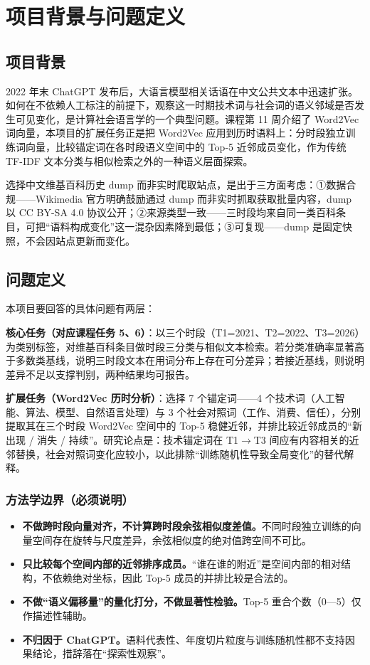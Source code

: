 \documentclass[12pt,a4paper]{article}
\begin{document}
\section{项目背景与问题定义}

\subsection{项目背景}

2022 年末 ChatGPT 发布后，大语言模型相关话语在中文公共文本中迅速扩张。如何在不依赖人工标注的前提下，观察这一时期技术词与社会词的语义邻域是否发生可见变化，是计算社会语言学的一个典型问题。课程第 11 周介绍了 Word2Vec 词向量，本项目的扩展任务正是把 Word2Vec 应用到历时语料上：分时段独立训练词向量，比较锚定词在各时段语义空间中的 Top-5 近邻成员变化，作为传统 TF-IDF 文本分类与相似检索之外的一种语义层面探索。

选择中文维基百科历史 dump 而非实时爬取站点，是出于三方面考虑：①数据合规——Wikimedia 官方明确鼓励通过 dump 而非实时抓取获取批量内容，dump 以 CC BY-SA 4.0 协议公开；②来源类型一致——三时段均来自同一类百科条目，可把“语料构成变化”这一混杂因素降到最低；③可复现——dump 是固定快照，不会因站点更新而变化。

\subsection{问题定义}

本项目要回答的具体问题有两层：

\textbf{核心任务（对应课程任务 5、6）}：以三个时段（T1=2021、T2=2022、T3=2026）为类别标签，对维基百科条目做时段三分类与相似文本检索。若分类准确率显著高于多数类基线，说明三时段文本在用词分布上存在可分差异；若接近基线，则说明差异不足以支撑判别，两种结果均可报告。

\textbf{扩展任务（Word2Vec 历时分析）}：选择 7 个锚定词——4 个技术词（人工智能、算法、模型、自然语言处理）与 3 个社会对照词（工作、消费、信任），分别提取其在三个时段 Word2Vec 空间中的 Top-5 稳健近邻，并排比较近邻成员的“新出现 / 消失 / 持续”。研究论点是：技术锚定词在 T1$\rightarrow$T3 间应有内容相关的近邻替换，社会对照词变化应较小，以此排除“训练随机性导致全局变化”的替代解释。

\subsubsection*{方法学边界（必须说明）}

\begin{itemize}[leftmargin=2em,itemsep=0pt]
  \item \textbf{不做跨时段向量对齐，不计算跨时段余弦相似度差值。}不同时段独立训练的向量空间存在旋转与尺度差异，余弦相似度的绝对值跨空间不可比。
  \item \textbf{只比较每个空间内部的近邻排序成员。}“谁在谁的附近”是空间内部的相对结构，不依赖绝对坐标，因此 Top-5 成员的并排比较是合法的。
  \item \textbf{不做“语义偏移量”的量化打分，不做显著性检验。}Top-5 重合个数（0—5）仅作描述性辅助。
  \item \textbf{不归因于 ChatGPT。}语料代表性、年度切片粒度与训练随机性都不支持因果结论，措辞落在“探索性观察”。
\end{itemize}
\end{document}
